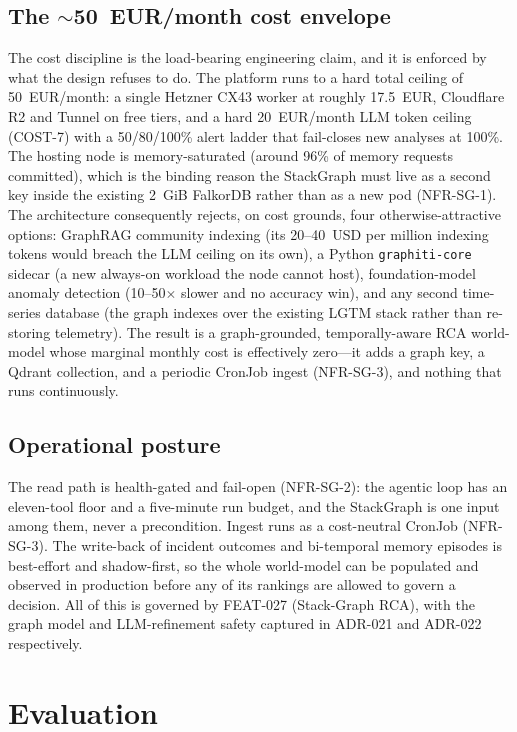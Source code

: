 \documentclass[11pt]{article}
\begin{document}
\subsection{The $\sim$50~EUR/month cost envelope}

The cost discipline is the load-bearing engineering claim, and it is enforced by
what the design refuses to do. The platform runs to a hard total ceiling of
50~EUR/month: a single Hetzner CX43 worker at roughly 17.5~EUR, Cloudflare R2 and
Tunnel on free tiers, and a hard 20~EUR/month LLM token ceiling (COST-7) with a
50/80/100\% alert ladder that fail-closes new analyses at 100\%. The hosting node
is memory-saturated (around 96\% of memory requests committed), which is the
binding reason the StackGraph must live as a second key inside the existing 2~GiB
FalkorDB rather than as a new pod (NFR-SG-1). The architecture consequently
rejects, on cost grounds, four otherwise-attractive options: GraphRAG community
indexing \citep{edge2024graphrag} (its 20--40~USD per million indexing tokens
would breach the LLM ceiling on its own), a Python \texttt{graphiti-core} sidecar
\citep{rasmussen2025zep} (a new always-on workload the node cannot host),
foundation-model anomaly detection (10--50$\times$ slower and no accuracy win),
and any second time-series database (the graph indexes over the existing LGTM
stack rather than re-storing telemetry). The result is a graph-grounded,
temporally-aware RCA world-model whose marginal monthly cost is effectively
zero---it adds a graph key, a Qdrant collection, and a periodic CronJob ingest
(NFR-SG-3), and nothing that runs continuously.

\subsection{Operational posture}

The read path is health-gated and fail-open (NFR-SG-2): the agentic loop has an
eleven-tool floor and a five-minute run budget, and the StackGraph is one input
among them, never a precondition. Ingest runs as a cost-neutral CronJob
(NFR-SG-3). The write-back of incident outcomes and bi-temporal memory episodes
is best-effort and shadow-first, so the whole world-model can be populated and
observed in production before any of its rankings are allowed to govern a
decision. All of this is governed by FEAT-027 (Stack-Graph RCA), with the graph
model and LLM-refinement safety captured in ADR-021 and ADR-022 respectively.

\section{Evaluation}
\end{document}
